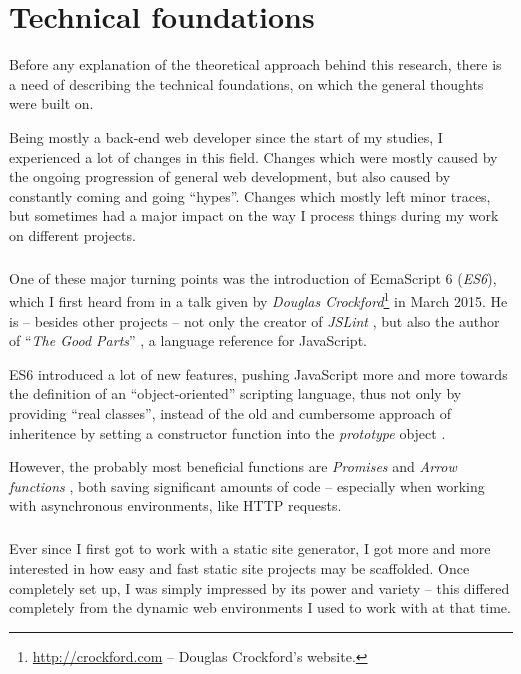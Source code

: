 \chapter{Technical foundations}
\label{cha:technicalfoundations}

Before any explanation of the theoretical approach behind this research, there is a need of describing the technical foundations, on which the general thoughts were built on.

Being mostly a back-end web developer since the start of my studies, I experienced a lot of changes in this field. Changes which were mostly caused by the ongoing progression of general web development, but also caused by constantly coming and going ``hypes''. Changes which mostly left minor traces, but sometimes had a major impact on the way I process things during my work on different projects.

\paragraph{} %
One of these major turning points was the introduction of EcmaScript 6 (\emph{ES6}), which I first heard from in a talk given by \emph{Douglas Crockford}\footnote{\url{http://crockford.com} -- Douglas Crockford's website.} in March 2015. He is -- besides other projects -- not only the creator of \emph{JSLint} \cite{JSLintDocumentation}, but also the author of ``\emph{The Good Parts}'' \cite{crockford2008javascript}, a language reference for JavaScript.

ES6 introduced a lot of new features, pushing JavaScript more and more towards the definition of an ``object-oriented'' scripting language, thus not only by providing ``real classes'', instead of the old and cumbersome approach of inheritence by setting a constructor function into the \emph{prototype} object \cite[47]{crockford2008javascript}.

However, the probably most beneficial functions are \emph{Promises} \cite{MDNPromise} and \emph{Arrow functions} \cite{MDNArrowFunctions}, both saving significant amounts of code -- especially when working with asynchronous environments, like HTTP requests.

\paragraph{} %
Ever since I first got to work with a static site generator, I got more and more interested in how easy and fast static site projects may be scaffolded. Once completely set up, I was simply impressed by its power and variety -- this differed completely from the dynamic web environments I used to work with at that time.


